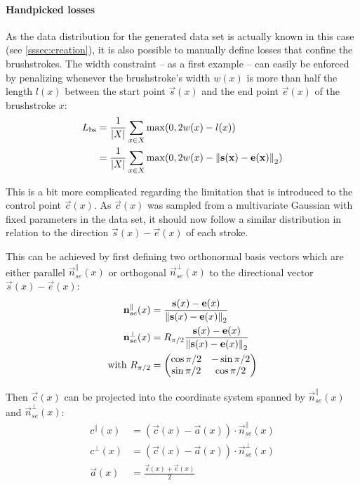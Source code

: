 \paragraph{Handpicked losses} As the data distribution for the generated data set is actually known in this case (see \ref{sssec:creation}), it is also possible to manually define losses that confine the brushstrokes.
The width constraint -- as a first example -- can easily be enforced by penalizing whenever the brushstroke's width $w(x)$ is more than half the length $l(x)$ between the start point $\vec{s}(x)$ and the end point $\vec{e}(x)$ of the brushstroke $x$:
\begin{align}
    L_{\text{bs}} & = \frac{1}{\vert X \vert}\sum_{x \in X} \max(0, 2w(x) - l(x)) \\
    & = \frac{1}{\vert X \vert}\sum_{x \in X} \max(0, 2w(x) - \left\lVert\mathbf{s(x)} - \mathbf{e(x)}\right\rVert_2)
\end{align}

This is a bit more complicated regarding the limitation that is introduced to the control point $\vec{c}(x)$.
As $\vec{c}(x)$ was sampled from a multivariate Gaussian with fixed parameters in the data set, it should now follow a similar distribution in relation to the direction $\vec{s}(x) - \vec{e}(x)$ of each stroke.

This can be achieved by first defining two orthonormal basis vectors which are either parallel $\vec{n}_{se}^\parallel(x)$ or orthogonal $\vec{n}_{se}^\bot(x)$ to the directional vector $\vec{s}(x) - \vec{e}(x)$:
\begin{align}
    \mathbf{n}_{se}^\parallel(x) & = \frac{\mathbf{s}(x) - \mathbf{e}(x)}{\left\lVert\mathbf{s}(x) - \mathbf{e}(x)\right\rVert_2} \\
    \mathbf{n}_{se}^\bot(x) & = R_{\pi/2} \frac{\mathbf{s}(x) - \mathbf{e}(x)}{\left\lVert\mathbf{s}(x) - \mathbf{e}(x)\right\rVert_2} \\
    \text{with } R_{\pi/2} & =
    \begin{pmatrix}
        \cos \pi/2 & -\sin \pi/2 \\
        \sin \pi/2 & \cos \pi/2
    \end{pmatrix}
\end{align}

Then $\vec{c}(x)$ can be projected into the coordinate system spanned by  $\vec{n}_{se}^\parallel(x)$ and $\vec{n}_{se}^\bot(x)$:
\begin{align}
    c^\parallel(x) & = (\vec{c}(x) - \vec{a}(x)) \cdot \vec{n}_{se}^\parallel(x)  \\
    c^\bot(x) & = (\vec{c}(x) - \vec{a}(x)) \cdot \vec{n}_{se}^\bot(x)  \\
    \vec{a}(x) & = \frac{\vec{s}(x) + \vec{e}(x)}{2}
\end{align}

